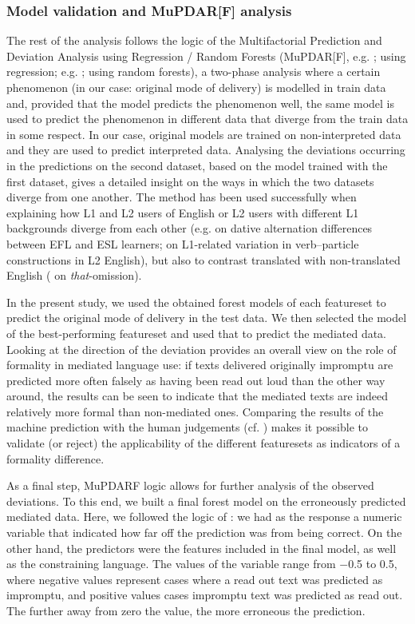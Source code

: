 \documentclass[output=paper]{langscibook}
\begin{document}
\subsubsection{Model validation and MuPDAR[F] analysis}\label{sec:ivaska:3.2.5}


The rest of the analysis follows the logic of the Multifactorial Prediction and Deviation Analysis using Regression / Random Forests (MuPDAR[F], e.g. \citealt{GriesDeshors2014}; \citealt{GriesAdelman2014} using regression; e.g. \citealt{DeshorsGries2016}; \citealt{GriesDeshors2020} using random forests), a two-phase analysis where a certain phenomenon (in our case: original mode of delivery) is modelled in train data and, provided that the model predicts the phenomenon well, the same model is used to predict the phenomenon in different data that diverge from the train data in some respect. In our case, original models are trained on non-interpreted data and they are used to predict interpreted data. Analysing the deviations occurring in the predictions on the second dataset, based on the model trained with the first dataset, gives a detailed insight on the ways in which the two datasets diverge from one another. The method has been used successfully when explaining how L1 and L2 users of English or L2 users with different L1 backgrounds diverge from each other (e.g. \citealt{GriesDeshors2015} on dative alternation differences between EFL and ESL learners; \citealt{WulffGries2019} on L1-related variation in verb–particle constructions in L2 English), but also to contrast translated with non-translated English (\citealt{KrugerDeSutter2018} on \textit{that}{}-omission).

In the present study, we used the obtained forest models of each featureset to predict the original mode of delivery in the test data. We then selected the model of the best-performing featureset and used that to predict the mediated data. Looking at the direction of the deviation provides an overall view on the role of formality in mediated language use: if texts delivered originally impromptu are predicted more often falsely as having been read out loud than the other way around, the results can be seen to indicate that the mediated texts are indeed relatively more formal than non-mediated ones. Comparing the results of the machine prediction with the human judgements (cf. ) makes it possible to validate (or reject) the applicability of the different featuresets as indicators of a formality difference. 

As a final step, MuPDARF logic allows for further analysis of the observed deviations. To this end, we built a final forest model on the erroneously predicted mediated data. Here, we followed the logic of \citet{DeshorsGries2016}: we had as the response a numeric variable that indicated how far off the prediction was from being correct. On the other hand, the predictors were the features included in the final model, as well as the constraining language. The values of the variable range from $-$0.5 to 0.5, where negative values represent cases where a read out text was predicted as impromptu, and positive values cases impromptu text was predicted as read out. The further away from zero the value, the more erroneous the prediction.
\end{document}
